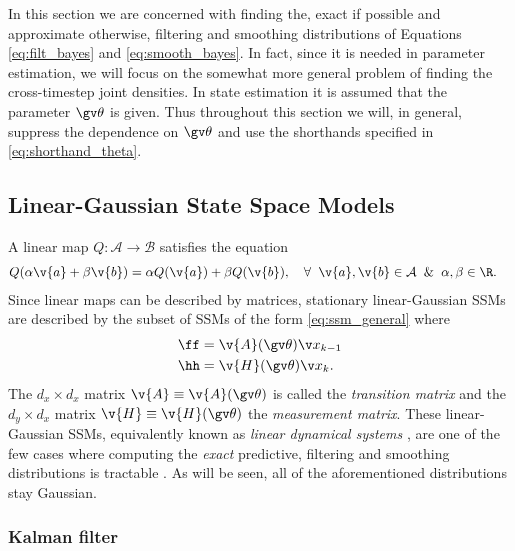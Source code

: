 
In this section we are concerned with finding the, exact if possible and approximate
otherwise, filtering and smoothing
distributions of Equations \eqref{eq:filt_bayes} and \eqref{eq:smooth_bayes}.
In fact, since it is needed in parameter estimation, we will focus on the somewhat 
more general problem of finding the cross-timestep joint densities. In state estimation 
it is assumed that the parameter $\Th$ is given.
Thus throughout this section we will, in general, suppress the dependence on $\Th$ 
and use the shorthands specified in \eqref{eq:shorthand_theta}. 

\subsection{Linear-Gaussian State Space Models}

A linear map $Q:\mathcal{A}\to\mathcal{B}$ satisfies the equation
\begin{align}
	Q(\alpha\v{a}+\beta\v{b}) &= \alpha Q(\v{a})+\beta Q(\v{b}), \quad \forall\;\; \v{a},\v{b}\in\mathcal{A}\;\;\&\;\;\alpha,\beta \in \R.
\end{align}%
%
Since linear maps can be described by matrices, stationary linear-Gaussian SSMs 
are described by the subset of SSMs of the form \eqref{eq:ssm_general} where  
\begin{align}
	\ff&=\v{A}(\Th)\x_{k-1}\\
	\hh&=\v{H}(\Th)\xk.
\end{align}
The $d_x\times d_x$ matrix $\v{A}\equiv\v{A}(\Th)$ is called the \emph{transition matrix} and
the $d_y\times d_x$ matrix $\v{H}\equiv \v{H}(\Th)$ the \emph{measurement matrix}.
These linear-Gaussian SSMs, equivalently known as \emph{linear dynamical systems} \parencite{Bishop2006},
are one of the few cases where computing the \emph{exact} predictive, filtering and
smoothing distributions is tractable \parencite[see, e.g.,][]{Sarkka2006}. As will be seen,
all of the aforementioned distributions stay Gaussian.

\subsubsection{Kalman filter}\label{sec:kalman_filter}

